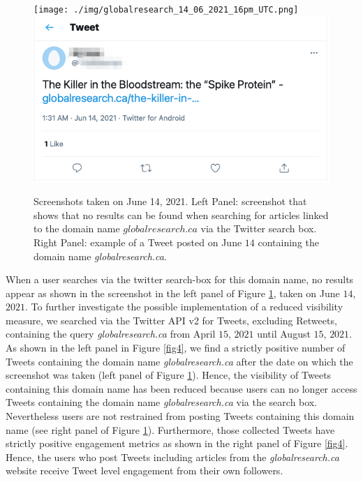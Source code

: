 \documentclass{article}
\begin{document}
\begin{figure}[h]
	\centering
	\texttt{[image: ./img/globalresearch\_14\_06\_2021\_16pm\_UTC.png]} 
	\includegraphics[scale=0.32]{./img/globalresearch/tweet.png} 

	\caption{Screenshots taken on June 14, 2021. Left Panel: screenshot that shows that no results can be found when searching for articles linked to the domain name $globalresearch.ca$ via the Twitter search box. Right Panel: example of a Tweet posted on June $14$ containing the domain name {\it globalresearch.ca}. }
		\label{fig3}
\end{figure}

\smallskip

When a user searches via the twitter search-box for this domain name, no results appear as shown in the screenshot in the left panel of Figure \ref{fig3}, taken on June $14$, $2021$. To further investigate the possible implementation of a reduced visibility measure, we searched via the Twitter API v2 for Tweets, excluding Retweets, containing the query {\it globalresearch.ca} from April $15$, $2021$ until August $15$, $2021$.  As shown in the left panel in Figure \ref{fig4}, we find a strictly positive number of Tweets containing the domain name {\it globalresearch.ca} after the date on which the screenshot was taken (left panel of Figure \ref{fig3}). Hence, the visibility of Tweets containing this domain name has been reduced because users can no longer access Tweets containing the domain name {\it globalresearch.ca} via the search box. Nevertheless users are not restrained from posting Tweets containing this domain name (see right panel of Figure \ref{fig3}). Furthermore, those collected Tweets have strictly positive engagement metrics as shown in the right panel of Figure \ref{fig4}. Hence, the users who post Tweets including articles from the {\it globalresearch.ca} website receive Tweet level engagement from their own followers. 
\end{document}
